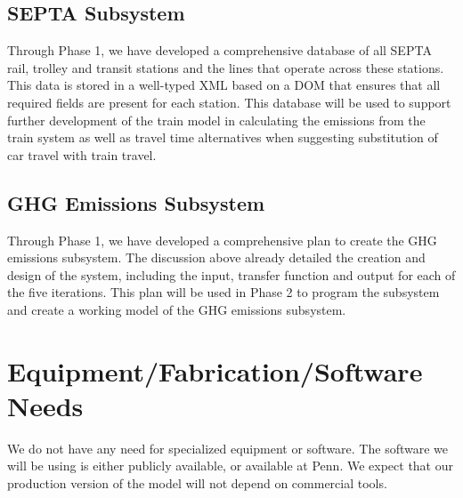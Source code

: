\documentclass[12pt]{article}
\begin{document}
\subsection{SEPTA Subsystem}
Through Phase 1, we have developed a comprehensive database of all
SEPTA rail, trolley and transit stations and the lines that operate
across these stations. This data is stored in a well-typed XML based
on a DOM that ensures that all required fields are present for each
station. This database will be used to support further development of
the train model in calculating the emissions from the train system as
well as travel time alternatives when suggesting substitution of car
travel with train travel.

\subsection{GHG Emissions Subsystem}
Through Phase 1, we
have developed a comprehensive plan to create the GHG emissions
subsystem. The discussion above already detailed the creation and
design of the system, including the input, transfer function and
output for each of the five iterations. This plan will be used in
Phase 2 to program the subsystem and create a working model of the GHG
emissions subsystem.

\addtocounter{section}{1} %

\section{Equipment/Fabrication/Software Needs}
We do not have any need for specialized equipment or software. The
software we will be using is either publicly available, or available
at Penn. We expect that our production version of the model will not
depend on commercial tools.

\addtocounter{section}{1} %
\end{document}
